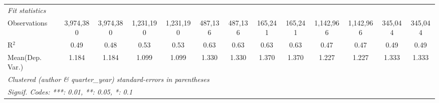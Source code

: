 \begin{tabular}{lcccccccccccc}
   \midrule
   \emph{Fit statistics}\\
   Observations                             & 3,974,380      & 3,974,380     & 1,231,190     & 1,231,190 & 487,136       & 487,136       & 165,241       & 165,241      & 1,142,966     & 1,142,966      & 345,044       & 345,044\\  
   R$^2$                                    & 0.49           & 0.48          & 0.53          & 0.53      & 0.63          & 0.63          & 0.63          & 0.63         & 0.47          & 0.47           & 0.49          & 0.49\\  
Mean(Dep. Var.) & 1.184 & 1.184 & 1.099 & 1.099 & 1.330 & 1.330 & 1.370 & 1.370 & 1.227 & 1.227 & 1.333 & 1.333 \\
   \midrule \midrule
   \multicolumn{13}{l}{\emph{Clustered (author \& quarter\_year) standard-errors in parentheses}}\\
   \multicolumn{13}{l}{\emph{Signif. Codes: ***: 0.01, **: 0.05, *: 0.1}}\\
\end{tabular}
\par\endgroup

